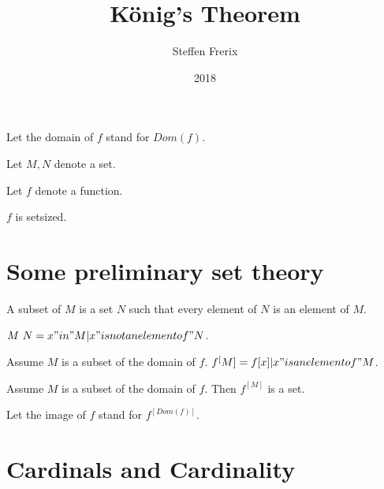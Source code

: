 \documentclass{document}
\title{König's Theorem}
\author{Steffen Frerix}
\date{2018}
\begin{document}

  \maketitle

  \begin{forthel}

    Let the domain of $f$ stand for $Dom(f)$.

    Let $M,N$ denote a set.

    Let $f$ denote a function.
    \begin{axiom}
      $f$ is setsized.
    \end{axiom}
  \end{forthel}


  \section*{Some preliminary set theory}

  \begin{forthel}
    \begin{definition}
      A subset of $M$ is a set $N$ such that every element of $N$ is an element of $M$.
    \end{definition}

    \begin{definition}
      $M \ N = {x "in" M | x "is not an element of" N}$.
    \end{definition}

    \begin{definition}
      Assume $M$ is a subset of the domain of $f$. $f^[M] = {f[x] | x "is an element of" M}$.
    \end{definition}

    \begin{axiom}
      Assume $M$ is a subset of the domain of $f$. Then $f^[M]$ is a set.
    \end{axiom}

    Let the image of $f$ stand for $f^[Dom(f)]$.
  \end{forthel}


  \section*{Cardinals and Cardinality}
\end{document}
